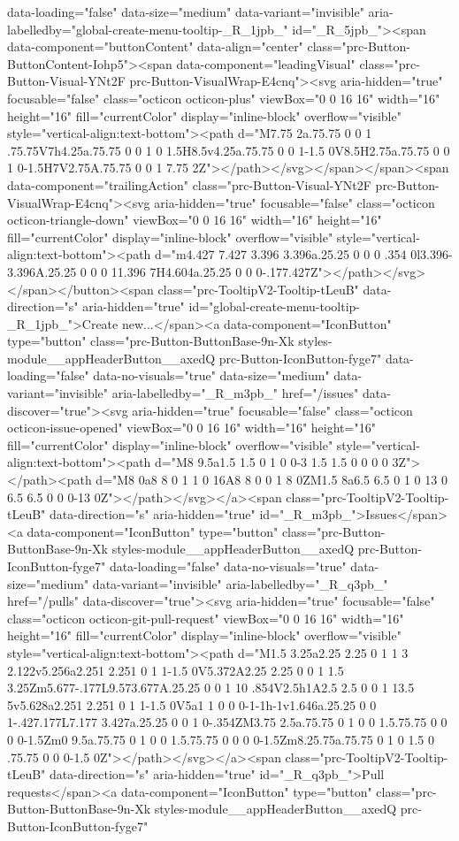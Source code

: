 {{data-loading="false" data-size="medium" data-variant="invisible" aria-labelledby="global-create-menu-tooltip-_R_1jpb_" id="_R_5jpb_"><span data-component="buttonContent" data-align="center" class="prc-Button-ButtonContent-Iohp5"><span data-component="leadingVisual" class="prc-Button-Visual-YNt2F prc-Button-VisualWrap-E4cnq"><svg aria-hidden="true" focusable="false" class="octicon octicon-plus" viewBox="0 0 16 16" width="16" height="16" fill="currentColor" display="inline-block" overflow="visible" style="vertical-align:text-bottom"><path d="M7.75 2a.75.75 0 0 1 .75.75V7h4.25a.75.75 0 0 1 0 1.5H8.5v4.25a.75.75 0 0 1-1.5 0V8.5H2.75a.75.75 0 0 1 0-1.5H7V2.75A.75.75 0 0 1 7.75 2Z"></path></svg></span></span><span data-component="trailingAction" class="prc-Button-Visual-YNt2F prc-Button-VisualWrap-E4cnq"><svg aria-hidden="true" focusable="false" class="octicon octicon-triangle-down" viewBox="0 0 16 16" width="16" height="16" fill="currentColor" display="inline-block" overflow="visible" style="vertical-align:text-bottom"><path d="m4.427 7.427 3.396 3.396a.25.25 0 0 0 .354 0l3.396-3.396A.25.25 0 0 0 11.396 7H4.604a.25.25 0 0 0-.177.427Z"></path></svg></span></button><span class="prc-TooltipV2-Tooltip-tLeuB" data-direction="s" aria-hidden="true" id="global-create-menu-tooltip-_R_1jpb_">Create new...</span><a data-component="IconButton" type="button" class="prc-Button-ButtonBase-9n-Xk styles-module__appHeaderButton__axedQ prc-Button-IconButton-fyge7" data-loading="false" data-no-visuals="true" data-size="medium" data-variant="invisible" aria-labelledby="_R_m3pb_" href="/issues" data-discover="true"><svg aria-hidden="true" focusable="false" class="octicon octicon-issue-opened" viewBox="0 0 16 16" width="16" height="16" fill="currentColor" display="inline-block" overflow="visible" style="vertical-align:text-bottom"><path d="M8 9.5a1.5 1.5 0 1 0 0-3 1.5 1.5 0 0 0 0 3Z"></path><path d="M8 0a8 8 0 1 1 0 16A8 8 0 0 1 8 0ZM1.5 8a6.5 6.5 0 1 0 13 0 6.5 6.5 0 0 0-13 0Z"></path></svg></a><span class="prc-TooltipV2-Tooltip-tLeuB" data-direction="s" aria-hidden="true" id="_R_m3pb_">Issues</span><a data-component="IconButton" type="button" class="prc-Button-ButtonBase-9n-Xk styles-module__appHeaderButton__axedQ prc-Button-IconButton-fyge7" data-loading="false" data-no-visuals="true" data-size="medium" data-variant="invisible" aria-labelledby="_R_q3pb_" href="/pulls" data-discover="true"><svg aria-hidden="true" focusable="false" class="octicon octicon-git-pull-request" viewBox="0 0 16 16" width="16" height="16" fill="currentColor" display="inline-block" overflow="visible" style="vertical-align:text-bottom"><path d="M1.5 3.25a2.25 2.25 0 1 1 3 2.122v5.256a2.251 2.251 0 1 1-1.5 0V5.372A2.25 2.25 0 0 1 1.5 3.25Zm5.677-.177L9.573.677A.25.25 0 0 1 10 .854V2.5h1A2.5 2.5 0 0 1 13.5 5v5.628a2.251 2.251 0 1 1-1.5 0V5a1 1 0 0 0-1-1h-1v1.646a.25.25 0 0 1-.427.177L7.177 3.427a.25.25 0 0 1 0-.354ZM3.75 2.5a.75.75 0 1 0 0 1.5.75.75 0 0 0 0-1.5Zm0 9.5a.75.75 0 1 0 0 1.5.75.75 0 0 0 0-1.5Zm8.25.75a.75.75 0 1 0 1.5 0 .75.75 0 0 0-1.5 0Z"></path></svg></a><span class="prc-TooltipV2-Tooltip-tLeuB" data-direction="s" aria-hidden="true" id="_R_q3pb_">Pull requests</span><a data-component="IconButton" type="button" class="prc-Button-ButtonBase-9n-Xk styles-module__appHeaderButton__axedQ prc-Button-IconButton-fyge7" }}
